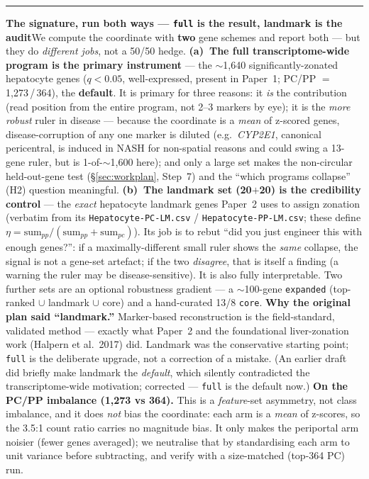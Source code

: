 \documentclass[11pt]{article}
\newcommand{\aside}[2]{\par\medskip\noindent\textcolor{teal0}{\rule{2pt}{\baselineskip}}\quad\textbf{\textcolor{teal0}{#1}}\quad #2\par\medskip}
\newcommand{\gene}[1]{\textit{#1}}
\newcommand{\code}[1]{\texttt{#1}}
\begin{document}
\aside{The signature, run both ways --- \code{full} is the result, landmark is the audit}{We compute
the coordinate with \textbf{two} gene schemes and report both --- but they do \emph{different jobs}, not
a 50/50 hedge.
\textbf{(a)~The full transcriptome-wide program is the primary instrument} --- the $\sim$1{,}640
significantly-zonated hepatocyte genes ($q<0.05$, well-expressed, present in Paper~1; PC/PP $=$
1{,}273\,/\,364), the \textbf{default}. It is primary for three reasons: it \emph{is} the contribution
(read position from the entire program, not 2--3 markers by eye); it is the \emph{more robust} ruler in
disease --- because the coordinate is a \emph{mean} of z-scored genes, disease-corruption of any one
marker is diluted (e.g.\ \gene{CYP2E1}, canonical pericentral, is induced in NASH for non-spatial
reasons and could swing a 13-gene ruler, but is 1-of-$\sim$1{,}600 here); and only a large set makes the
non-circular held-out-gene test (\S\ref{sec:workplan}, Step~7) and the ``which programs collapse'' (H2)
question meaningful.
\textbf{(b)~The landmark set (20$+$20) is the credibility control} --- the \emph{exact} hepatocyte
landmark genes Paper~2 uses to assign zonation (verbatim from its \code{Hepatocyte-PC-LM.csv} /
\code{Hepatocyte-PP-LM.csv}; these define $\eta = \text{sum}_{pp}/(\text{sum}_{pp}+\text{sum}_{pc})$).
Its job is to rebut ``did you
just engineer this with enough genes?'': if a maximally-different small ruler shows the \emph{same}
collapse, the signal is not a gene-set artefact; if the two \emph{disagree}, that is itself a finding (a
warning the ruler may be disease-sensitive). It is also fully interpretable. Two further sets are an
optional robustness gradient --- a $\sim$100-gene \code{expanded} (top-ranked $\cup$ landmark $\cup$ core)
and a hand-curated 13/8 \code{core}.
\textbf{Why the original plan said ``landmark.''} Marker-based reconstruction is the field-standard,
validated method --- exactly what Paper~2 and the foundational liver-zonation work (Halpern et al.\ 2017)
did. Landmark was the conservative starting point; \code{full} is the deliberate upgrade, not a
correction of a mistake. (An earlier draft did briefly make landmark the \emph{default}, which silently
contradicted the transcriptome-wide motivation; corrected --- \code{full} is the default now.)
\textbf{On the PC/PP imbalance (1{,}273 vs 364).} This is a \emph{feature}-set asymmetry, not class
imbalance, and it does \emph{not} bias the coordinate: each arm is a \emph{mean} of z-scores, so the
3.5:1 count ratio carries no magnitude bias. It only makes the periportal arm noisier (fewer genes
averaged); we neutralise that by standardising each arm to unit variance before subtracting, and verify
with a size-matched (top-364 PC) run.}
\end{document}
